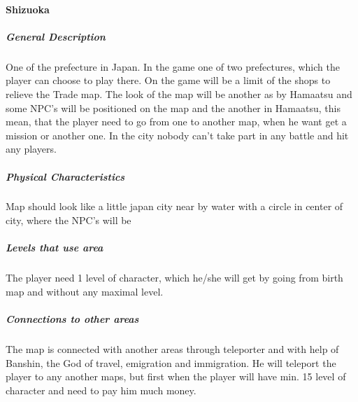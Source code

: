 \documentclass[parskip=full]{scrartcl}
\begin{document}
					\paragraph{Shizuoka}\vspace{-0.5cm}
						\subparagraph{General Description} \vspace{-0.5cm}
							\par \begingroup
							\leftskip=2cm
							\noindent
									One of the prefecture in Japan. In the game one of two prefectures, which the player can choose to play there. On the game will be a limit of the shops to relieve the Trade map. The look of the map will be another as by Hamaatsu and some NPC’s will be positioned on the map and the another in Hamaatsu, this mean, that the player need to go from one to another map, when he want get a mission or another one. In the city nobody can’t take part in any battle and hit any players.
							\par \endgroup
						\subparagraph{Physical Characteristics} \vspace{-0.5cm}
							\par \begingroup
							\leftskip=2cm
							\noindent
									Map should look like a little japan city near by water with a circle in center of city, where the NPC's will be
							\par \endgroup
						\subparagraph{Levels that use area} \vspace{-0.5cm}
							\par \begingroup
							\leftskip=2cm
							\noindent
									The player need 1 level of character, which he/she will get by going from birth map and without any maximal level. 
							\par \endgroup
						\subparagraph{Connections to other areas} \vspace{-0.5cm}
							\par \begingroup
							\leftskip=2cm
							\noindent
									The map is connected with another areas through teleporter and with help of Banshin, the God of travel, emigration and immigration. He will teleport the player to any another maps, but first when the player will have min. 15 level of character and need to pay him much money. 
							\par \endgroup
\end{document}
